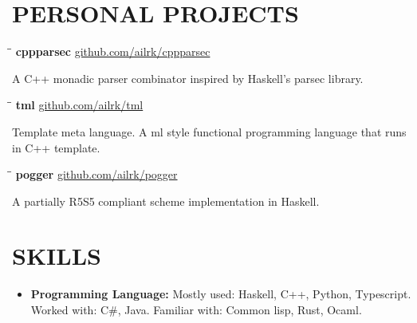 \documentclass{res}
\begin{document}
\begin{resume}
\begin{itemize}[leftmargin=-.1in]
\end{itemize}

\vspace{-0.2in}
\section{PERSONAL PROJECTS}

    \vspace{-0.1in}
    \begin{tabbing}
        \hspace{2.4in}\= \hspace{0.9in}\= \kill
        {\bf cppparsec } \>               \>\url{github.com/ailrk/cppparsec}\\

    \end{tabbing}\vspace{-30pt}
    A C++ monadic parser combinator inspired by Haskell's parsec library.

    \vspace{-0.2in}
    \begin{tabbing}
        \hspace{2.4in}\= \hspace{0.9in}\= \kill
        {\bf tml} \>               \>\url{github.com/ailrk/tml}\\

    \end{tabbing}\vspace{-30pt}
    Template meta language. A ml style functional programming language that runs in C++ template.

    \begin{tabbing}
        \hspace{2.4in}\= \hspace{0.9in}\= \kill
        {\bf pogger } \>               \>\url{github.com/ailrk/pogger}\\

    \end{tabbing}\vspace{-30pt}
    A partially R5S5 compliant scheme implementation in Haskell.


\section{SKILLS}
    \begin{itemize}[leftmargin=-.2in]
        \setlength\itemsep{-1em}
          \item \textbf{Programming Language:} Mostly used: Haskell, C++,  Python, Typescript. Worked with: C\#, Java. Familiar with: Common lisp, Rust, Ocaml.
          \\


\end{itemize}
\end{resume}
\end{document}
